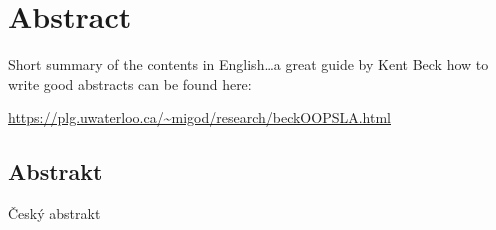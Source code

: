 \begingroup
\let\clearpage\relax
\let\cleardoublepage\relax
\let\cleardoublepage\relax

\chapter*{Abstract}
Short summary of the contents in English\dots a great guide by
Kent Beck how to write good abstracts can be found here:
\begin{center}
\url{https://plg.uwaterloo.ca/~migod/research/beckOOPSLA.html}
\end{center}

\vfill

\begin{otherlanguage}{czech}
\chapter*{Abstrakt}
Český abstrakt
\end{otherlanguage}

\endgroup

\vfill
